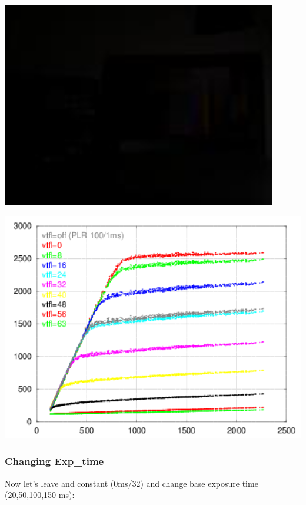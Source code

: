 \begin{center}
\includegraphics[height=9cm]{images/100ms-1ms-63-tiny}
\end{center}

\begin{center}
\includegraphics[height=10cm]{images/100-1-x-plr-vs-30ms-lin}
\end{center}

\subsubsection{Changing Exp\_time}

Now let's leave  and  constant (0ms/32) and change base exposure time (20,50,100,150 ms):\\

